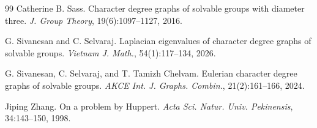 \documentclass[11pt]{amsart}
\theoremstyle{definition}
\theoremstyle{remark}
\numberwithin{equation}{section}
\begin{document}
\begin{thebibliography}{99}
 Catherine B. Sass. Character degree graphs of solvable groups with diameter three. \emph{J. Group Theory}, 19(6):1097--1127, 2016.

 G. Sivanesan and C. Selvaraj. Laplacian eigenvalues of character degree graphs of solvable groups. \emph{Vietnam J. Math.}, 54(1):117--134, 2026.

 G. Sivanesan, C. Selvaraj, and T. Tamizh Chelvam. Eulerian character degree graphs of solvable groups. \emph{AKCE Int. J. Graphs. Combin.}, 21(2):161--166, 2024.

 Jiping Zhang. On a problem by Huppert. \emph{Acta Sci. Natur. Univ. Pekinensis}, 34:143--150, 1998.

\end{thebibliography}
\end{document}

